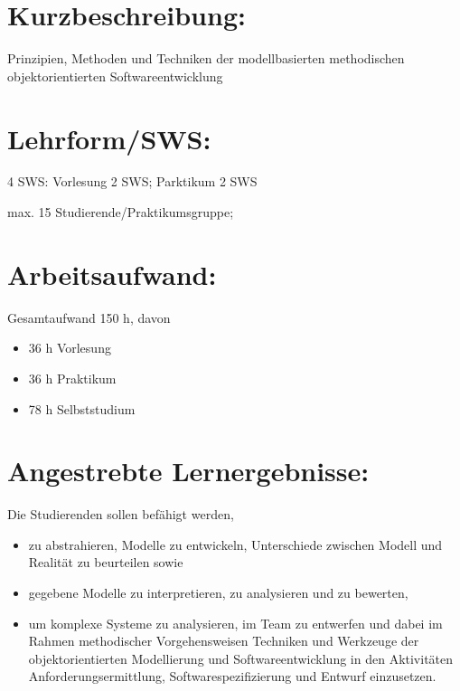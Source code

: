 \section*{Kurzbeschreibung:}\label{kurzbeschreibung-4}

Prinzipien, Methoden und Techniken der modellbasierten methodischen
objektorientierten Softwareentwicklung

\section*{Lehrform/SWS:}\label{lehrformsws-22}

4 SWS: Vorlesung 2 SWS; Parktikum 2 SWS

max. 15 Studierende/Praktikumsgruppe;

\section*{Arbeitsaufwand:}\label{arbeitsaufwand-21}

Gesamtaufwand 150 h, davon

\begin{itemize}
\tightlist
\item
  36 h Vorlesung
\item
  36 h Praktikum
\item
  78 h Selbststudium
\end{itemize}

\section*{Angestrebte
Lernergebnisse:}\label{angestrebte-lernergebnisse-22}

Die Studierenden sollen befähigt werden,

\begin{itemize}
\tightlist
\item
  zu abstrahieren, Modelle zu entwickeln, Unterschiede zwischen Modell
  und Realität zu beurteilen sowie
\item
  gegebene Modelle zu interpretieren, zu analysieren und zu bewerten,
\item
  um komplexe Systeme zu analysieren, im Team zu entwerfen und dabei im
  Rahmen methodischer Vorgehensweisen Techniken und Werkzeuge der
  objektorientierten Modellierung und Softwareentwicklung in den
  Aktivitäten Anforderungsermittlung, Softwarespezifizierung und Entwurf
  einzusetzen.
\end{itemize}

